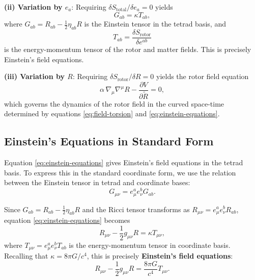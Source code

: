 \documentclass[11pt,a4paper]{article}
\numberwithin{equation}{section}
\theoremstyle{plain}
\theoremstyle{definition}
\theoremstyle{remark}
\begin{document}
\textbf{(ii) Variation by $e_a$}: Requiring $\delta S_{\mathrm{total}}/\delta e_a = 0$ yields
\begin{equation}
G_{ab} = \kappa T_{ab},
\label{eq:einstein-equations}
\end{equation}
where $G_{ab} = R_{ab} - \frac{1}{2}\eta_{ab}R$ is the Einstein tensor in the tetrad basis, and
\begin{equation}
T_{ab} = \frac{\delta S_{\mathrm{rotor}}}{\delta e^{ab}}
\end{equation}
is the energy-momentum tensor of the rotor and matter fields. This is precisely Einstein's field equations.

\textbf{(iii) Variation by $R$}: Requiring $\delta S_{\mathrm{rotor}}/\delta R = 0$ yields the rotor field equation
\begin{equation}
\alpha\, \nabla_\mu \nabla^\mu R - \frac{\partial V}{\partial \widetilde{R}} = 0,
\label{eq:rotor-dynamics}
\end{equation}
which governs the dynamics of the rotor field in the curved space-time determined by equations \eqref{eq:field-torsion} and \eqref{eq:einstein-equations}.

\subsection{Einstein's Equations in Standard Form}

Equation \eqref{eq:einstein-equations} gives Einstein's field equations in the tetrad basis. To express this in the standard coordinate form, we use the relation between the Einstein tensor in tetrad and coordinate bases:
\begin{equation}
G_{\mu\nu} = e_\mu^a e_\nu^b G_{ab}.
\end{equation}

Since $G_{ab} = R_{ab} - \frac{1}{2}\eta_{ab}R$ and the Ricci tensor transforms as $R_{\mu\nu} = e_\mu^a e_\nu^b R_{ab}$, equation \eqref{eq:einstein-equations} becomes
\begin{equation}
R_{\mu\nu} - \frac{1}{2}g_{\mu\nu}R = \kappa T_{\mu\nu},
\label{eq:einstein-standard}
\end{equation}
where $T_{\mu\nu} = e_\mu^a e_\nu^b T_{ab}$ is the energy-momentum tensor in coordinate basis. Recalling that $\kappa = 8\pi G/c^4$, this is precisely \textbf{Einstein's field equations}:
\begin{equation}
R_{\mu\nu} - \frac{1}{2}g_{\mu\nu}R = \frac{8\pi G}{c^4} T_{\mu\nu}.
\label{eq:einstein-final}
\end{equation}
\end{document}
